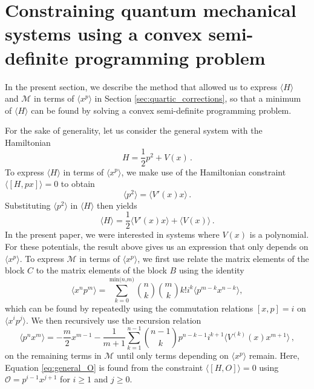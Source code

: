 \documentclass[a4paper,11pt]{article}
\numberwithin{equation}{section}
\begin{document}
\appendix
{}

\section{Constraining quantum mechanical systems using a convex semi-definite programming problem}
\label{ap:convex}

In the present section, we describe the method that allowed us to express $\langle H \rangle$ and $\mathcal{M}$ in terms of $\langle x^p \rangle$ in Section \ref{sec:quartic_corrections}, so that a minimum of $\langle H \rangle$ can be found by solving a convex semi-definite programming problem. 

For the sake of generality, let us consider the general system with the Hamiltonian
\begin{equation}
    H = \frac{1}{2} p^2 + V(x) \, .
\end{equation}
To express $\langle H \rangle$ in terms of $\langle x^p \rangle$, we make use of the Hamiltonian constraint $\langle [ H , p x ] \rangle = 0$ to obtain
\begin{equation}
\langle p^{2} \rangle =  \langle V'(x) x \rangle \, .
\end{equation}
Substituting $\langle p^{2} \rangle$ in $\langle H \rangle$ then yields
\begin{equation}
\langle H \rangle =  \frac{1}{2} \langle V'(x) x \rangle + \langle V(x) \rangle\, .
\end{equation}
In the present paper, we were interested in systems where $V(x)$ is a polynomial. For these potentials, the result above gives us an expression that only depends on $\langle x^p \rangle$. To express $\mathcal{M}$ in terms of $\langle x^p \rangle$, we first use relate the matrix elements of the block $C$ to the matrix elements of the block $B$ using the identity
\begin{equation}
    \langle x^n p^m \rangle = \sum_{k = 0}^{\text{min($n$,$m$)}}{ n \choose k} { m \choose k} k! i^k \langle p^{m-k} x^{n-k} \rangle ,
\end{equation}
which can be found by repeatedly using the commutation relations $[x,p] = i$ on $\langle x^i p^j \rangle$. We then recursively use the recursion relation
\begin{equation}
\langle p^{n} x^{m} \rangle= - \frac{m}{2} x^{m-1} - \frac{1}{m+1}\sum_{k=1}^{n-1} { n-1 \choose k} p^{n-k-1} i^{k+1} \langle V^{(k)}(x) x^{m+1} \rangle \, ,
\label{eq:general_O}
\end{equation}
on the remaining terms in $\mathcal{M}$ until only terms depending on $\langle x^p \rangle$ remain. Here, Equation \ref{eq:general_O} is found from the constraint $\langle [ H , O ] \rangle = 0$ using $\mathcal{O} = p^{i-1} x^{j+1}$ for $i \geq 1$ and $j \geq 0$.
\end{document}
